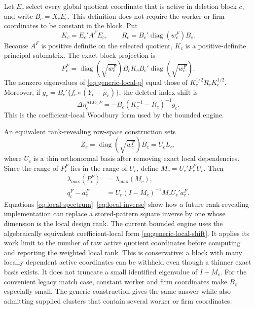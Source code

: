\documentclass[11pt]{article}
\newcommand{\diag}{\operatorname{diag}}
\newcommand{\ALO}{\mathrm{ALO}}
\begin{document}
Let $E_c$ select every global quotient coordinate that is active in deletion
block $c$, and write $B_c=X_cE_c$. This definition does not require the worker
or firm coordinates to be constant in the block. Put
\[
 K_c=E_c'A^FE_c,
 \qquad R_c=B_c'\diag(w_c^F)B_c.
\]
Because $A^F$ is positive definite on the selected quotient, $K_c$ is a
positive-definite principal submatrix. The exact block projection is
\begin{equation}
 P_c^F=\diag(\sqrt{w_c^F})B_cK_cB_c'
       \diag(\sqrt{w_c^F}).                            \label{eq:generic-local-p}
\end{equation}
The nonzero eigenvalues of \eqref{eq:generic-local-p} equal those of
$K_c^{1/2}R_cK_c^{1/2}$. Moreover, if
$g_c=B_c'\{f_c\circ(Y_c-\widehat\mu_c)\}$, the deleted index shift is
\begin{equation}
 \Delta\eta_c^{\ALO,F}
 =-B_c(K_c^{-1}-R_c)^{-1}g_c.                          \label{eq:generic-local-shift}
\end{equation}
This is the coefficient-local Woodbury form used by the bounded engine.

An equivalent rank-revealing row-space construction sets
\[
 Z_c=\diag(\sqrt{w_c^F})B_c=U_cL_c,
\]
where $U_c$ is a thin orthonormal basis after removing exact local
dependencies. Since the range of $P_c^F$ lies in the range of $U_c$, define
$M_c=U_c'P_c^FU_c$. Then
\begin{align}
 \lambda_{\max}(P_c^F)&=\lambda_{\max}(M_c),             \label{eq:local-spectrum}\\
 q_c^F-a_c^F
 &=U_c(I-M_c)^{-1}M_cU_c'a_c^F.                          \label{eq:local-inverse}
\end{align}
Equations \eqref{eq:local-spectrum}--\eqref{eq:local-inverse} show how a future
rank-revealing implementation can replace a stored-pattern square inverse by
one whose dimension is the local design rank. The current bounded engine uses
the algebraically equivalent coefficient-local form
\eqref{eq:generic-local-shift}. It applies its work limit to the number of raw
active quotient coordinates before computing and reporting the weighted local
rank. This is conservative: a block with many locally dependent active
coordinates can be withheld even though a thinner exact basis exists. It does
not truncate a small identified eigenvalue of $I-M_c$.
For the convenient legacy match case, constant worker and firm coordinates
make $B_c$ especially small. The generic construction gives the same answer
while also admitting supplied clusters that contain several worker or firm
coordinates.
\end{document}
